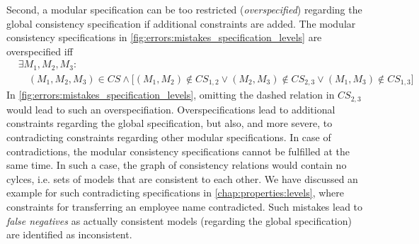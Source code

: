 Second, a modular specification can be too restricted (\emph{overspecified}) regarding the global consistency specification if additional constraints are added. 
The modular consistency specifications in \autoref{fig:errors:mistakes_specification_levels} are overspecified iff
\begin{align*}
    & \exists M_1, M_2, M_3 : \\
    & \hspace{1em} (M_1, M_2, M_3) \in \mathit{CS} \land \big[ (M_1, M_2) \not\in \mathit{CS}_{1,2} \lor (M_2, M_3) \not\in \mathit{CS}_{2,3} \lor (M_1, M_3) \not\in \mathit{CS}_{1,3} \big]
\end{align*}
In \autoref{fig:errors:mistakes_specification_levels}, omitting the dashed relation in $\mathit{CS}_{2,3}$ would lead to such an overspecifiation.
Overspecifications lead to additional constraints regarding the global specification, but also, and more severe, to contradicting constraints regarding other modular specifications.
In case of contradictions, the modular consistency specifications cannot be fulfilled at the same time.
In such a case, the graph of consistency relations %
would contain no cylces, i.e. sets of models that are consistent to each other.
We have discussed an example for such contradicting specifications %
in \autoref{chap:properties:levels}, where constraints for transferring an employee name contradicted. %
Such mistakes lead to \emph{false negatives} as actually consistent models (regarding the global specification) are identified as inconsistent. %


